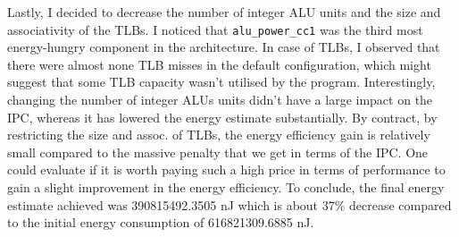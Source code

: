 \documentclass[11pt]{article}
\begin{document}
Lastly, I decided to  decrease the number of integer ALU units and the size and
associativity of the TLBs. I noticed that \texttt{alu\_power\_cc1} was the
third most energy-hungry component in the architecture. In case of TLBs, I
observed that there were almost none TLB misses in the default configuration,
which might suggest that some TLB capacity wasn't utilised by the program.
Interestingly, changing the number of integer ALUs units didn't have a large
impact on the IPC, whereas it has lowered the energy estimate substantially. By
contract, by restricting the size and assoc. of TLBs, the energy efficiency
gain is relatively small compared to the massive penalty that we get in terms
of the IPC. One could evaluate if it is worth paying such a high price in terms
of performance to gain a slight improvement in the energy efficiency. To
conclude, the final energy estimate achieved was 390815492.3505 nJ which is
about 37\% decrease compared to the initial energy consumption of
616821309.6885 nJ.
\end{document}
